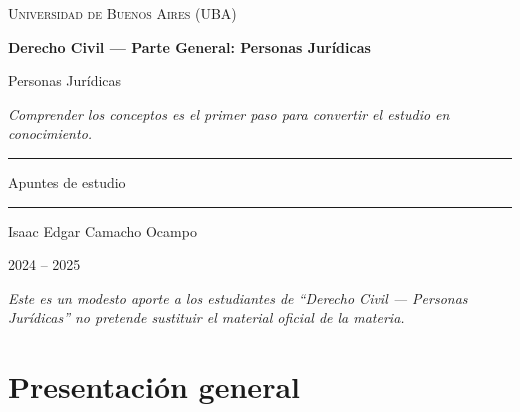 \documentclass[12pt,oneside]{book}
\newcommand{\universidad}{Universidad de Buenos Aires (UBA)}
\newcommand{\materia}{Derecho Civil --- Parte General: Personas Jurídicas}
\newcommand{\titulo}{Personas Jurídicas}
\newcommand{\autor}{Isaac Edgar Camacho Ocampo}
\newcommand{\anio}{2024 -- 2025}
\begin{document}
\begin{titlepage}
\thispagestyle{empty}

\begin{center}

\vspace*{1cm}

{\large \textsc{\universidad}}

\vspace{3cm}

{\Huge \textbf{\materia}}

\vspace{1cm}

{\LARGE \titulo}

\vspace{0.8cm}

\textit{Comprender los conceptos es el primer paso para convertir el estudio en conocimiento.}

\vspace{1.2cm}

\rule{0.70\textwidth}{0.5pt}

\vspace{0.5cm}

{\large Apuntes de estudio}

\vspace{0.5cm}

\rule{0.70\textwidth}{0.5pt}

\vfill

{\large \autor}

\vspace{0.3cm}

{\large \anio}

\end{center}

\vfill

\begin{flushleft}
\textit{Este es un modesto aporte a los estudiantes de ``Derecho Civil --- Personas Jurídicas'' no pretende sustituir el material oficial de la materia.}
\end{flushleft}

\end{titlepage}

\tableofcontents


\chapter*{Presentación general}
\end{document}
